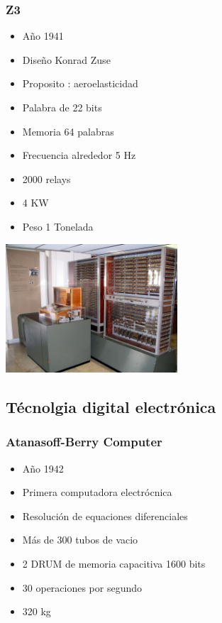 \documentclass{beamer}
\begin{document}
\begin{frame}
\frametitle{Z3}
\begin{minipage}[c]{5.25cm}
	\begin{itemize}
		\item Año 1941
		\item Diseño Konrad Zuse
		\item Proposito : aeroelasticidad
		\item Palabra de 22 bits
		\item Memoria 64 palabras
		\item Frecuencia alrededor 5 Hz
		\item 2000 relays
		\item 4 KW
		\item Peso 1 Tonelada
	\end{itemize}
\end{minipage}
\begin{minipage}[c]{6.4cm}
\includegraphics[width=6.4cm]{Z3_Deutsches_Museum.JPG}
\end{minipage}
\end{frame}

\subsection{Técnolgia digital electrónica}
\begin{frame}
\frametitle{Atanasoff-Berry Computer}
\begin{itemize}
	\item Año 1942
	\item Primera computadora electrócnica 
	\item Resolución de equaciones diferenciales
	\item Más de 300 tubos de vacio
	\item 2 DRUM de memoria capacitiva 1600 bits
	\item 30 operaciones por segundo
	\item 320 kg
\end{itemize}
\end{frame}
\end{document}
